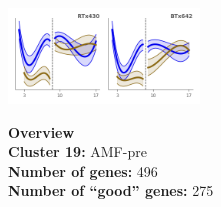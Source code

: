 \begin{multicols}{2}
\includegraphics[width=2in]{figures/clusters/root_Preflowering_18.png}
\columnbreak

\noindent \textbf{Overview}\\\textbf{Cluster 19:} AMF-pre \\
\textbf{Number of genes:} 496 \\
\textbf{Number of ``good'' genes:} 275 \\
\end{multicols}

